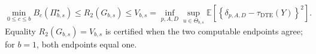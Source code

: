 \[\min_{0\le c\le b}B_c(\Pi_{b,s}^{\star})\le R_2(G_{b,s})\le V_{b,s}=\inf_{p,A,D}\sup_{u\in\Theta_{b,s}}\mathbb E\!\left[\left\{\delta_{p,A,D}-\tau_{\mathrm{DTE}}(Y)\right\}^2\right].\] Equality \(R_2(G_{b,s})=V_{b,s}\) is certified when the two computable endpoints agree; for \(b=1\), both endpoints equal one.